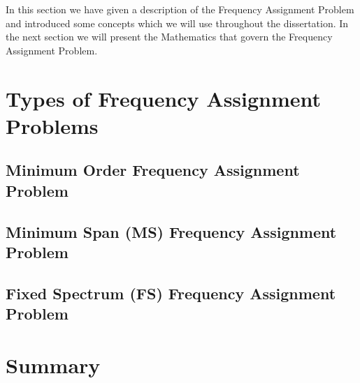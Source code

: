In this section we have given a description of the Frequency Assignment Problem and introduced some concepts which we will use throughout the dissertation. In the next section we will present the 
Mathematics that govern the Frequency Assignment Problem.
\section{Types of Frequency Assignment Problems}
\subsection{Minimum Order Frequency Assignment Problem}
\subsection{Minimum Span (MS) Frequency Assignment Problem}
\subsection{Fixed Spectrum (FS) Frequency Assignment Problem}
\section{Summary}
